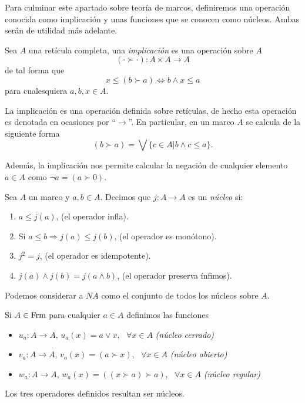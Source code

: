 \documentclass{comunicaciones}
\begin{document}
Para culminar este apartado sobre teoría de marcos, definiremos una operación conocida como implicación y unas funciones que se conocen como núcleos. Ambas serán de utilidad más adelante. 

\begin{dfn}\label{Implicacion}
Sea $A$ una retícula completa, una \emph{implicación} es una operación sobre $A$ $$(\cdot \succ \cdot):A\times A\to A$$ de tal forma que $$x\leq (b\succ a)\Leftrightarrow b\wedge x\leq a$$
para cualesquiera $a,b,x\in A$.
\end{dfn}

La implicación es una operación definida sobre retículas, de hecho esta operación es denotada en ocasiones por ``$\rightarrow$''. En particular, en un marco $A$ se calcula de la siguiente forma $$(b\succ a)=\bigvee\{c\in A|b\wedge c\leq a\}.$$

Además, la implicación nos permite calcular la negación de cualquier elemento $a\in A$ como $\neg a=(a\succ 0).$

\begin{dfn}\label{Operadores}
Sea $A$ un marco y $a, b\in A$. Decimos que $j\colon A\to A$ es un \emph{núcleo} si:

\begin{enumerate}
\item $a\leq j(a)$, (el operador infla).
\item Si $a\leq b\Rightarrow j(a)\leq j(b)$, (el operador es monótono).
\item $j^2=j$, (el operador es idempotente).\\
\item $j(a)\wedge j(b)=j(a\wedge b)$, (el operador preserva ínfimos).
\end{enumerate}
\end{dfn}
Podemos considerar a $NA$ como el conjunto de todos los núcleos sobre $A$.

\begin{ej}\label{ua,va,wa}
Si $A\in \mathrm{Frm}$ para cualquier $a\in A$ definimos las funciones
\begin{itemize}
\item $u_a\colon A\to A, \, u_a(x)=a\vee x, \mbox{    }\forall x\in A$ \emph{(núcleo cerrado)}
\item $v_a\colon A\to A, \, v_a(x)=(a\succ x), \mbox{    }\forall x\in A$ \emph{(núcleo abierto)}
\item $w_a\colon A\to A, \, w_a(x)=((x\succ a)\succ a), \mbox{    }\forall x\in A$ \emph{(núcleo regular)}
\end{itemize}
Los tres operadores definidos resultan ser núcleos.
\end{ej}
\end{document}

